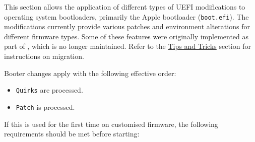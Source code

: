 \documentclass[]{article}
\providecommand{\tightlist}{%
  \setlength{\itemsep}{0pt}\setlength{\parskip}{0pt}}
\begin{document}
This section allows the application of different types of UEFI modifications to
operating system bootloaders, primarily the Apple bootloader (\texttt{boot.efi}).
The modifications currently provide various patches and environment alterations for
different firmware types. Some of these features were originally implemented as part
of \href{https://github.com/acidanthera/AptioFixPkg}{},
which is no longer maintained. Refer to the \hyperref[troubleshootingtricks]{Tips and Tricks}
section for instructions on migration.

Booter changes apply with the following effective order:
\begin{itemize}
\tightlist
\item \texttt{Quirks} are processed.
\item \texttt{Patch} is processed.
\end{itemize}

If this is used for the first time on customised firmware, the following requirements
should be met before starting:
\end{document}

